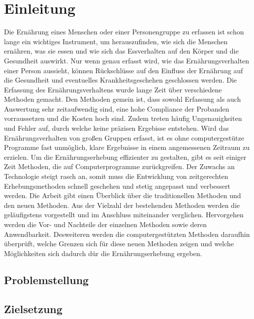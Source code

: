 
\section{Einleitung}
Die Ernährung eines Menschen oder einer Personengruppe zu erfassen ist schon lange ein wichtiges Instrument, um herauszufinden, wie sich die Menschen ernähren, was sie essen und wie sich das Essverhalten auf den Körper und die Gesundheit auswirkt. Nur wenn genau erfasst wird, wie das Ernährungsverhalten einer Person aussieht, können Rückschlüsse auf den Einfluss der Ernährung auf die Gesundheit und eventuelles Krankheitsgeschehen geschlossen werden. 
Die Erfassung des Ernährungsverhaltens wurde lange Zeit über verschiedene Methoden gemacht. Den Methoden gemein ist, dass sowohl Erfassung als auch Auswertung sehr zeitaufwendig sind, eine hohe Compliance der Probanden vorraussetzen und die Kosten hoch sind. Zudem treten häufig Ungenauigkeiten und Fehler auf, durch welche keine präzisen Ergebisse entstehen. 
Wird das Ernährungsverhalten von großen Gruppen erfasst, ist es ohne computergestütze Programme fast unmöglich, klare Ergebnisse in einem angemessenen Zeitraum zu erzielen. 
Um die Ernährungserhebung effizienter zu gestalten, gibt es seit einiger Zeit Methoden, die auf Computerprogramme zurückgreifen. Der Zuwachs an Technologie steigt rasch an, somit muss die Entwicklung von zeitgerechten Erhebungsmethoden schnell geschehen und stetig angepasst und verbessert werden. Die Arbeit gibt einen Überblick über die traditionellen Methoden und den neuen Methoden. Aus der Vielzahl der bestehenden Methoden werden die geläufigstens vorgestellt und im Anschluss miteinander verglichen. Hervorgehen werden die Vor- und Nachteile der einzelnen Methoden sowie deren Anwendbarkeit. Desweiteren werden die computergestützten 
Methoden daraufhin überprüft, welche Grenzen sich für diese neuen Methoden zeigen und welche Möglichkeiten sich dadurch dür die Ernährungserhebung ergeben. 

\subsection{Problemstellung}

\subsection{Zielsetzung}